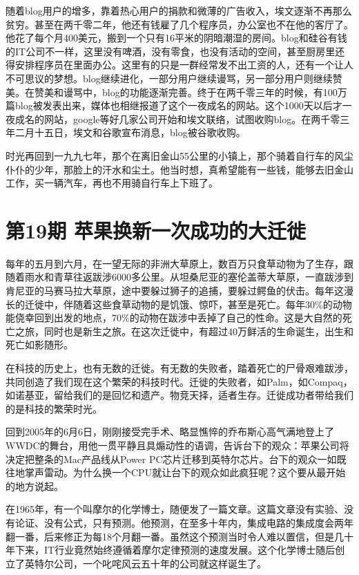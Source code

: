 \documentclass[
  letterpaper,
  DIV=11,
  numbers=noendperiod]{scrreprt}
\begin{document}
随着blog用户的增多，靠着热心用户的捐款和微薄的广告收入，埃文逐渐不再那么贫穷。甚至在两千零二年，他还有钱雇了几个程序员，办公室也不在他的客厅了。他花了每个月400美元，搬到一个只有16平米的阴暗潮湿的房间。blog和硅谷有钱的IT公司不一样，这里没有啤酒，没有零食，也没有活动的空间，甚至厨房里还得安排程序员在里面办公。这里有的只是一群经常发不出工资的人，还有一个让人不可思议的梦想。blog继续进化，一部分用户继续谩骂，另一部分用户则继续赞美。在赞美和谩骂中，blog的功能逐渐完善。终于在两千零三年的时候，有100万篇blog被发表出来，媒体也相继报道了这个一夜成名的网站。这个1000天以后才一夜成名的网站，google等好几家公司开始和埃文联络，试图收购blog。在两千零三年二月十五日，埃文和谷歌宣布消息，blog被谷歌收购。

时光再回到一九九七年，那个在离旧金山55公里的小镇上，那个骑着自行车的风尘仆仆的少年，那脸上的汗水和尘土。他当时想，真希望能有一些钱，能够去旧金山工作，买一辆汽车，再也不用骑自行车上下班了。


\chapter{第19期
苹果换新一次成功的大迁徙}\label{ux7b2c19ux671f-ux82f9ux679cux6362ux65b0ux4e00ux6b21ux6210ux529fux7684ux5927ux8fc1ux5f99}

每年的五月到六月，在一望无际的非洲大草原上，数百万只食草动物为了生存，跟随着雨水和青草往返跋涉6000多公里。从坦桑尼亚的塞伦盖蒂大草原，一直跋涉到肯尼亚的马赛马拉大草原，途中要躲过狮子的追捕，要躲过鳄鱼的伏击。每年这漫长的迁徙中，伴随着这些食草动物的是饥饿、惊吓，甚至是死亡。每年30\%的动物能侥幸回到出发的地点，70\%的动物在跋涉中丢掉了自己的性命。这是大自然的死亡之旅，同时也是新生之旅。在这次迁徙中，有超过40万鲜活的生命诞生，出生和死亡如影随形。

在科技的历史上，也有无数的迁徙。有无数的失败者，踏着死亡的尸骨艰难跋涉，共同创造了我们现在这个繁荣的科技时代。迁徙的失败者，如Palm，如Compaq，如诺基亚，留给我们的是回忆和遗产。物竞天择，适者生存。迁徙成功者带给我们的是科技的繁荣时光。

回到2005年的6月6日，刚刚接受完手术、略显憔悴的乔布斯心高气满地登上了WWDC的舞台，用他一贯平静且具煽动性的语调，告诉台下的观众：苹果公司将决定把整条的Mac产品线从Power
PC芯片迁移到英特尔芯片。台下的观众一如既往地掌声雷动。为什么换一个CPU就让台下的观众如此疯狂呢？这个要从最开始的地方说起。

在1965年，有一个叫摩尔的化学博士，随便发了一篇文章。这篇文章没有实验、没有论证、没有公式，只有预测。他预测，在至多十年内，集成电路的集成度会两年翻一番，后来修正为每18个月翻一番。虽然这个预测当时令人难以置信，但是几十年下来，IT行业竟然始终遵循着摩尔定律预测的速度发展。这个化学博士随后创立了英特尔公司，一个叱咤风云五十年的公司就这样诞生了。
\end{document}
